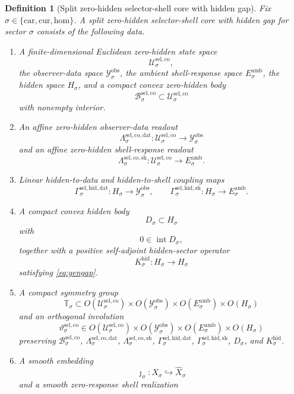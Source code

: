\documentclass[11pt]{article}
\newcommand{\Car}{\mathrm{car}}
\newcommand{\Cur}{\mathrm{cur}}
\newcommand{\Hom}{\mathrm{hom}}
\newcommand{\VisibleAffine}[1]{\widehat X_{#1}}
\newcommand{\DataSpace}[1]{\mathcal Y_{#1}^{\mathrm{obs}}}
\newcommand{\AmbientTarget}[1]{E_{#1}^{\mathrm{amb}}}
\newcommand{\GapSpace}[1]{H_{#1}}
\newcommand{\GapBody}[1]{D_{#1}}
\newcommand{\HiddenOperator}[1]{K_{#1}^{\mathrm{hid}}}
\newcommand{\SelCoreSpace}[1]{\mathcal U_{#1}^{\mathrm{sel,co}}}
\newcommand{\SelCoreBody}[1]{\mathcal B_{#1}^{\mathrm{sel,co}}}
\newcommand{\SelCoreData}[1]{\Lambda_{#1}^{\mathrm{sel,co,dat}}}
\newcommand{\SelCoreShell}[1]{\Lambda_{#1}^{\mathrm{sel,co,sh}}}
\newcommand{\SelHiddenData}[1]{\Gamma_{#1}^{\mathrm{sel,hid,dat}}}
\newcommand{\SelHiddenShell}[1]{\Gamma_{#1}^{\mathrm{sel,hid,sh}}}
\newcommand{\SelCoreSym}[1]{\mathbb T_{#1}}
\newcommand{\SelCoreTime}[1]{\vartheta_{#1}^{\mathrm{sel,co}}}
\newtheorem{definition}{Definition}
\begin{document}
\begin{definition}[Split zero-hidden selector-shell core with hidden gap]
\label{def:splitcore}
Fix \(\sigma\in\{\Car,\Cur,\Hom\}\). A \emph{split zero-hidden selector-shell core with hidden gap} for sector \(\sigma\) consists of the following data.
\begin{enumerate}
    \item A finite-dimensional Euclidean zero-hidden state space
    \[
    \SelCoreSpace{\sigma},
    \]
    the observer-data space \(\DataSpace{\sigma}\), the ambient shell-response space \(\AmbientTarget{\sigma}\), the hidden space \(\GapSpace{\sigma}\), and a compact convex zero-hidden body
    \[
    \SelCoreBody{\sigma}\subset\SelCoreSpace{\sigma}
    \]
    with nonempty interior.
    \item An affine zero-hidden observer-data readout
    \[
    \SelCoreData{\sigma}:\SelCoreSpace{\sigma}\to\DataSpace{\sigma}
    \]
    and an affine zero-hidden shell-response readout
    \[
    \SelCoreShell{\sigma}:\SelCoreSpace{\sigma}\to\AmbientTarget{\sigma}.
    \]
    \item Linear hidden-to-data and hidden-to-shell coupling maps
    \[
    \SelHiddenData{\sigma}:\GapSpace{\sigma}\to\DataSpace{\sigma},
    \qquad
    \SelHiddenShell{\sigma}:\GapSpace{\sigma}\to\AmbientTarget{\sigma}.
    \]
    \item A compact convex hidden body
    \[
    \GapBody{\sigma}\subset\GapSpace{\sigma}
    \]
    with
    \[
    0\in\operatorname{int}\GapBody{\sigma},
    \]
    together with a positive self-adjoint hidden-sector operator
    \[
    \HiddenOperator{\sigma}:\GapSpace{\sigma}\to\GapSpace{\sigma}
    \]
    satisfying \eqref{eq:gengap}.
    \item A compact symmetry group
    \[
    \SelCoreSym{\sigma}\subset
    O(\SelCoreSpace{\sigma})\times
    O(\DataSpace{\sigma})\times
    O(\AmbientTarget{\sigma})\times
    O(\GapSpace{\sigma})
    \]
    and an orthogonal involution
    \[
    \SelCoreTime{\sigma}\in
    O(\SelCoreSpace{\sigma})\times
    O(\DataSpace{\sigma})\times
    O(\AmbientTarget{\sigma})\times
    O(\GapSpace{\sigma})
    \]
    preserving \(\SelCoreBody{\sigma}\), \(\SelCoreData{\sigma}\), \(\SelCoreShell{\sigma}\), \(\SelHiddenData{\sigma}\), \(\SelHiddenShell{\sigma}\), \(\GapBody{\sigma}\), and \(\HiddenOperator{\sigma}\).
    \item A smooth embedding
    \[
    \jmath_{\sigma}:X_{\sigma}\hookrightarrow\VisibleAffine{\sigma}
    \]
    and a smooth zero-response shell realization

\end{enumerate}
\end{definition}
\end{document}
